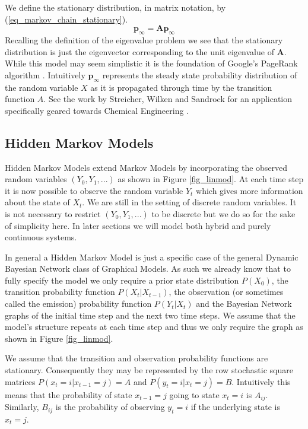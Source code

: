 We define the stationary distribution, in matrix notation, by (\ref{eq_markov_chain_stationary}).
\begin{equation}
\mathbf{p}_{\infty} = \mathbf{A}\mathbf{p}_{\infty}
\label{eq_markov_chain_stationary}
\end{equation}
Recalling the definition of the eigenvalue problem we see that the stationary distribution is just the eigenvector corresponding to the unit eigenvalue of $\mathbf{A}$. While this model may seem simplistic it is the foundation of Google's PageRank algorithm \cite{google}.  Intuitively $\mathbf{p}_\infty$ represents the steady state probability distribution of the random variable $X$ as it is propagated through time by the transition function $A$. See the work by Streicher, Wilken and Sandrock for an application specifically geared towards Chemical Engineering \cite{streicher}.

\subsection{Hidden Markov Models}
Hidden Markov Models extend Markov Models by incorporating the observed random variables $(Y_0, Y_1,...)$ as shown in Figure \ref{fig_linmod}. At each time step it is now possible to observe the random variable $Y_t$ which gives more information about the state of $X_t$. We are still in the setting of discrete random variables. It is not necessary to restrict $(Y_0, Y_1,...)$ to be discrete but we do so for the sake of simplicity here. In later sections we will model both hybrid and purely continuous systems. 

In general a Hidden Markov Model is just a specific case of the general Dynamic Bayesian Network class of Graphical Models. As such we already know that to fully specify the model we only require a prior state distribution $P(X_0)$, the transition probability function $P(X_t|X_{t-1})$, the observation (or sometimes called the emission) probability function $P(Y_t|X_t)$ and the Bayesian Network graphs of the initial time step and the next two time steps. We assume that the model's structure repeats at each time step and thus we only require the graph as shown in Figure \ref{fig_linmod}.

We assume that the transition and observation probability functions are stationary. Consequently they may be represented by the row stochastic square matrices $P(x_t=i|x_{t-1}=j) = A$ and $P(y_t=i|x_t=j) = B$. Intuitively this means that the probability of state $x_{t-1}=j$ going to state $x_{t} = i$ is $A_{ij}$. Similarly, $B_{ij}$ is the probability of observing $y_t=i$ if the underlying state is $x_t=j$.

